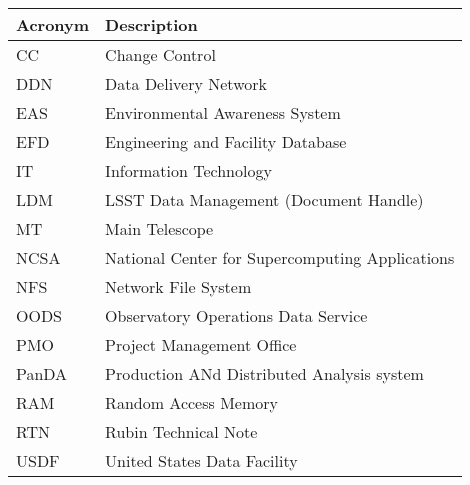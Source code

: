 \addtocounter{table}{-1}
\begin{longtable}{p{}p{}}\hline
\textbf{Acronym} & \textbf{Description}  \\\hline

CC & Change Control \\\hline
DDN & Data Delivery Network \\\hline
EAS & Environmental Awareness System \\\hline
EFD & Engineering and Facility Database \\\hline
IT & Information Technology \\\hline
LDM & LSST Data Management (Document Handle) \\\hline
MT & Main Telescope \\\hline
NCSA & National Center for Supercomputing Applications \\\hline
NFS & Network File System \\\hline
OODS & Observatory Operations Data Service \\\hline
PMO & Project Management Office \\\hline
PanDA &  Production ANd Distributed Analysis system \\\hline
RAM & Random Access Memory \\\hline
RTN & Rubin Technical Note \\\hline
USDF & United States Data Facility \\\hline
\end{longtable}
